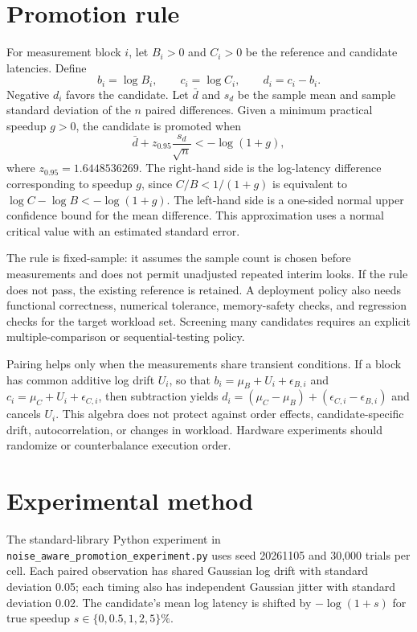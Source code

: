 \documentclass[11pt]{article}
\begin{document}
\section{Promotion rule}
For measurement block $i$, let $B_i>0$ and $C_i>0$ be the reference and candidate latencies. Define
\[
 b_i=\log B_i,\qquad c_i=\log C_i,\qquad d_i=c_i-b_i.
\]
Negative $d_i$ favors the candidate. Let $\bar d$ and $s_d$ be the sample mean and sample standard deviation of the $n$ paired differences. Given a minimum practical speedup $g>0$, the candidate is promoted when
\begin{equation}
 \bar d + z_{0.95}\frac{s_d}{\sqrt n} < -\log(1+g),
 \label{eq:gate}
\end{equation}
where $z_{0.95}=1.6448536269$. The right-hand side is the log-latency difference corresponding to speedup $g$, since $C/B<1/(1+g)$ is equivalent to $\log C-\log B<-\log(1+g)$. The left-hand side is a one-sided normal upper confidence bound for the mean difference. This approximation uses a normal critical value with an estimated standard error.

The rule is fixed-sample: it assumes the sample count is chosen before measurements and does not permit unadjusted repeated interim looks. If the rule does not pass, the existing reference is retained. A deployment policy also needs functional correctness, numerical tolerance, memory-safety checks, and regression checks for the target workload set. Screening many candidates requires an explicit multiple-comparison or sequential-testing policy.

Pairing helps only when the measurements share transient conditions. If a block has common additive log drift $U_i$, so that $b_i=\mu_B+U_i+\epsilon_{B,i}$ and $c_i=\mu_C+U_i+\epsilon_{C,i}$, then subtraction yields $d_i=(\mu_C-\mu_B)+(\epsilon_{C,i}-\epsilon_{B,i})$ and cancels $U_i$. This algebra does not protect against order effects, candidate-specific drift, autocorrelation, or changes in workload. Hardware experiments should randomize or counterbalance execution order.

\section{Experimental method}
The standard-library Python experiment in \texttt{noise\_aware\_promotion\_experiment.py} uses seed 20261105 and 30,000 trials per cell. Each paired observation has shared Gaussian log drift with standard deviation 0.05; each timing also has independent Gaussian jitter with standard deviation 0.02. The candidate's mean log latency is shifted by $-\log(1+s)$ for true speedup $s\in\{0,0.5,1,2,5\}\%$.
\end{document}
